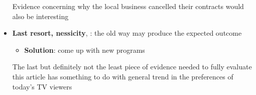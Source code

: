 \documentclass{article}
\begin{document}
\begin{itemize}
      Evidence concerning why the local business cancelled their contracts
      would also be interesting

      \item \textbf{Last resort, nessicity}, : the old
      way may produce the expected outcome
      \begin{itemize}
        \item \textbf{Solution}: come up with new programs
      \end{itemize}

      The last but definitely not the least piece of evidence needed to fully
      evaluate this article has something to do with general trend in the
      preferences of today's TV viewers
    \end{itemize}
\end{document}
